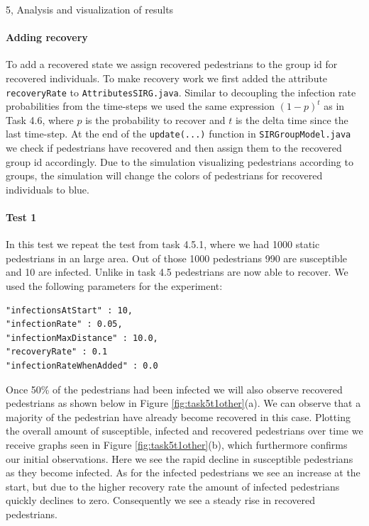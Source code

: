 \begin{task}{5, Analysis and visualization of results}
\paragraph{Adding recovery}
To add a recovered state we assign recovered pedestrians to the group id for recovered individuals. To make recovery work we first added the attribute \verb+recoveryRate+ to \verb+AttributesSIRG.java+. Similar to decoupling the infection rate probabilities from the time-steps we used the same expression $(1-p)^t$ as in Task 4.6, where $p$ is the probability to recover and $t$ is the delta time since the last time-step. At the end of the \verb+update(...)+ function in \verb+SIRGroupModel.java+ we check if pedestrians have recovered and then assign them to the recovered group id accordingly. Due to the simulation visualizing pedestrians according to groups, the simulation will change the colors of pedestrians for recovered individuals to blue. 

\paragraph{Test 1}
In this test we repeat the test from task 4.5.1, where we had 1000 static pedestrians in an large area. Out of those 1000 pedestrians 990 are susceptible and 10 are infected. Unlike in task 4.5 pedestrians are now able to recover. We used the following parameters for the experiment:
\begin{verbatim}
"infectionsAtStart" : 10,
"infectionRate" : 0.05,
"infectionMaxDistance" : 10.0,
"recoveryRate" : 0.1
"infectionRateWhenAdded" : 0.0
\end{verbatim}
Once 50\% of the pedestrians had been infected we will also observe recovered pedestrians as shown below in Figure \ref{fig:task5t1other}(a). We can observe that a majority of the pedestrian have already become recovered in this case. Plotting the overall amount of susceptible, infected and recovered pedestrians over time we receive graphs seen in Figure \ref{fig:task5t1other}(b), which furthermore confirms our initial observations. Here we see the rapid decline in susceptible pedestrians as they become infected. As for the infected pedestrians we see an increase at the start, but due to the higher recovery rate the amount of infected pedestrians quickly declines to zero. Consequently we see a steady rise in recovered pedestrians.


\end{task}
